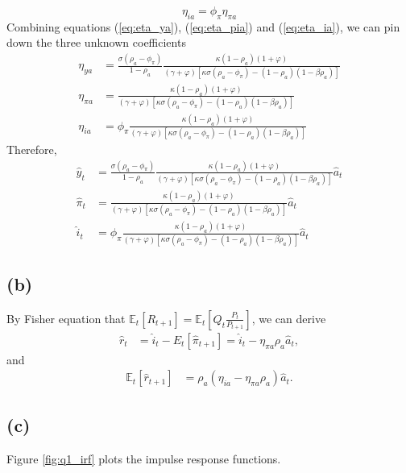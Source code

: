 \documentclass[12pt]{article}
\newcommand{\E}{\mathbb{E}}
\begin{document}
\begin{equation}
\label{eq:eta_ia}
\eta_{ia} = \phi_{\pi}\eta_{\pi a}
\end{equation}
Combining equations (\ref{eq:eta_ya}), (\ref{eq:eta_pia}) and (\ref{eq:eta_ia}),
we can pin down the three unknown coefficients
\newcommand{\etapia}{\frac{\kappa\left(1-\rho_{a}\right)\left(1+\varphi\right)}{\left(\gamma+\varphi\right)\left[\kappa\sigma\left(\rho_{a}-\phi_{\pi}\right)-\left(1-\rho_{a}\right)\left(1-\beta\rho_{a}\right)\right]}}
\begin{align*}
\eta_{ya} &= \frac{\sigma\left(\rho_{a}-\phi_{\pi}\right)}{1-\rho_{a}} \etapia \\
\eta_{\pi a} &= \etapia \\
\eta_{ia} &= \phi_{\pi}\etapia 
\end{align*}
Therefore, 
\begin{align*}
\hat{y}_{t} &= \frac{\sigma\left(\rho_{a}-\phi_{\pi}\right)}{1-\rho_{a}} \etapia \hat{a}_{t} \\
\hat{\pi}_{t} &= \etapia \hat{a}_{t} \\
\hat{i}_{t} &= \phi_{\pi}\etapia \hat{a}_{t}
\end{align*}

\subsection*{(b)}

By Fisher equation that $\E_{t}\left[R_{t+1}\right]=\E_{t}\left[Q_{t}\frac{P_{t}}{P_{t+1}}\right]$, we can derive
\begin{align*}
\hat{r}_{t} &= \hat{i}_{t} - E_{t}\left[\hat{\pi}_{t+1}\right] = \hat{i}_{t} - \eta_{\pi a}\rho_{a}\hat{a}_{t},
\end{align*}
and
\begin{align*}
\E_{t}\left[\hat{r}_{t+1}\right] &= \rho_{a}\left(\eta_{ia} - \eta_{\pi a}\rho_{a}\right) \hat{a}_{t}.
\end{align*}

\subsection*{(c)}

Figure \ref{fig:q1_irf} plots the impulse response functions.
\end{document}
